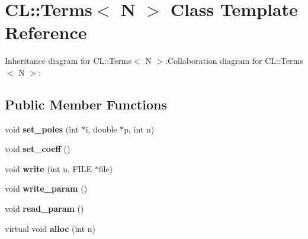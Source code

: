\hypertarget{classCL_1_1Terms}{
\section{CL::Terms$<$ N $>$ Class Template Reference}
\label{classCL_1_1Terms}
}
Inheritance diagram for CL::Terms$<$ N $>$:Collaboration diagram for CL::Terms$<$ N $>$:\subsection*{Public Member Functions}
\begin{DoxyCompactItemize}
\item 
\hypertarget{classCL_1_1Terms_a4c473cd263b71294b675216a1ea5cb02}{
void {\bfseries set\_\-poles} (int $\ast$i, double $\ast$p, int n)}
\label{classCL_1_1Terms_a4c473cd263b71294b675216a1ea5cb02}

\item 
\hypertarget{classCL_1_1Terms_a6c45b26f23ec661fb439eb9f0ce567ab}{
void {\bfseries set\_\-coeff} ()}
\label{classCL_1_1Terms_a6c45b26f23ec661fb439eb9f0ce567ab}

\item 
\hypertarget{classCL_1_1Terms_a6aa95892ae24ceadeb80e4d3304bde27}{
void {\bfseries write} (int n, FILE $\ast$file)}
\label{classCL_1_1Terms_a6aa95892ae24ceadeb80e4d3304bde27}

\item 
\hypertarget{classCL_1_1Terms_af23aca809572dbbf23c02c1abdcc3dce}{
void {\bfseries write\_\-param} ()}
\label{classCL_1_1Terms_af23aca809572dbbf23c02c1abdcc3dce}

\item 
\hypertarget{classCL_1_1Terms_a4aadf66009582c55492bcf52e67813b7}{
void {\bfseries read\_\-param} ()}
\label{classCL_1_1Terms_a4aadf66009582c55492bcf52e67813b7}

\item 
\hypertarget{classCL_1_1Terms_a5bcce9d5baf7d072fc48b1f99008b624}{
virtual void {\bfseries alloc} (int n)}
\label{classCL_1_1Terms_a5bcce9d5baf7d072fc48b1f99008b624}

\end{DoxyCompactItemize}
